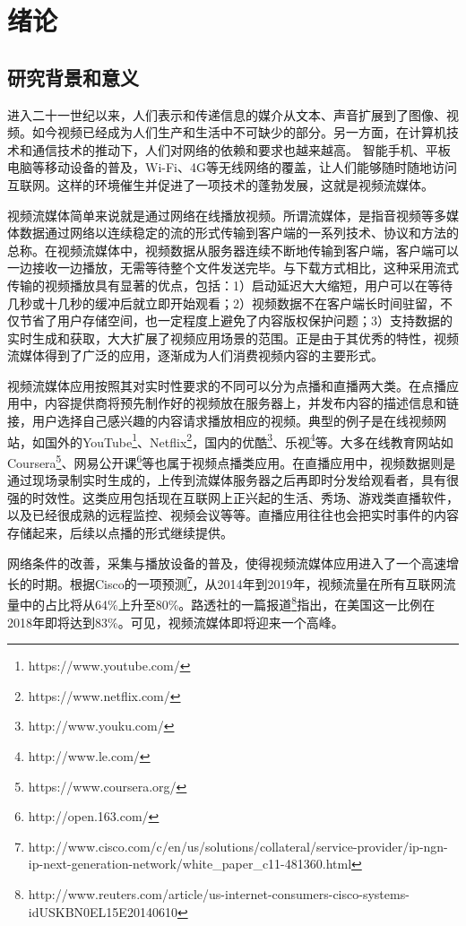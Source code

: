 \chapter{绪论}

\section{研究背景和意义}

进入二十一世纪以来，人们表示和传递信息的媒介从文本、声音扩展到了图像、视频。如今视频已经成为人们生产和生活中不可缺少的部分。另一方面，在计算机技术和通信技术的推动下，人们对网络的依赖和要求也越来越高。
智能手机、平板电脑等移动设备的普及，Wi-Fi、4G等无线网络的覆盖，让人们能够随时随地访问互联网。这样的环境催生并促进了一项技术的蓬勃发展，这就是视频流媒体。

视频流媒体简单来说就是通过网络在线播放视频。所谓流媒体，是指音视频等多媒体数据通过网络以连续稳定的流的形式传输到客户端的一系列技术、协议和方法的总称。在视频流媒体中，视频数据从服务器连续不断地传输到客户端，客户端可以一边接收一边播放，无需等待整个文件发送完毕。与下载方式相比，这种采用流式传输的视频播放具有显著的优点\supercite{Li2002}，包括：1）启动延迟大大缩短，用户可以在等待几秒或十几秒的缓冲后就立即开始观看；2）视频数据不在客户端长时间驻留，不仅节省了用户存储空间，也一定程度上避免了内容版权保护问题；3）支持数据的实时生成和获取，大大扩展了视频应用场景的范围。正是由于其优秀的特性，视频流媒体得到了广泛的应用，逐渐成为人们消费视频内容的主要形式\supercite{Chen2013}。

视频流媒体应用按照其对实时性要求的不同可以分为点播和直播两大类。在点播应用中，内容提供商将预先制作好的视频放在服务器上，并发布内容的描述信息和链接，用户选择自己感兴趣的内容请求播放相应的视频。典型的例子是在线视频网站，如国外的YouTube\footnote{https://www.youtube.com/}、Netflix\footnote{https://www.netflix.com/}，国内的优酷\footnote{http://www.youku.com/}、乐视\footnote{http://www.le.com/}等。大多在线教育网站如Coursera\footnote{https://www.coursera.org/}、网易公开课\footnote{http://open.163.com/}等也属于视频点播类应用。在直播应用中，视频数据则是通过现场录制实时生成的，上传到流媒体服务器之后再即时分发给观看者，具有很强的时效性。这类应用包括现在互联网上正兴起的生活、秀场、游戏类直播软件，以及已经很成熟的远程监控、视频会议等等。直播应用往往也会把实时事件的内容存储起来，后续以点播的形式继续提供。

网络条件的改善，采集与播放设备的普及，使得视频流媒体应用进入了一个高速增长的时期。根据Cisco的一项预测\footnote{http://www.cisco.com/c/en/us/solutions/collateral/service-provider/ip-ngn-ip-next-generation-network/white\_paper\_c11-481360.html}，从2014年到2019年，视频流量在所有互联网流量中的占比将从64\%上升至80\%。路透社的一篇报道\footnote{http://www.reuters.com/article/us-internet-consumers-cisco-systems-idUSKBN0EL15E20140610}指出，在美国这一比例在2018年即将达到83\%。可见，视频流媒体即将迎来一个高峰。

